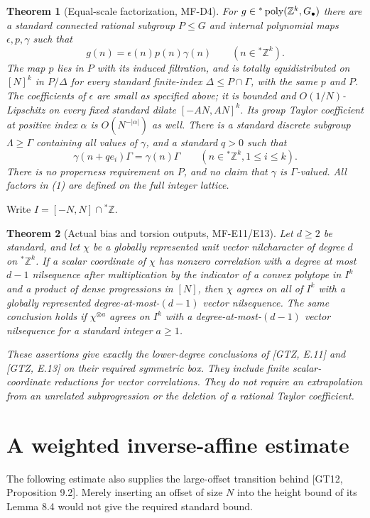 \documentclass[11pt]{article}
\newtheorem{theorem}{Theorem}
\newcommand{\Z}{\mathbb Z}\newcommand{\R}{\mathbb R}
\begin{document}
\begin{theorem}[Equal-scale factorization, MF-D4]\label{thm:factor}
For $g\in{}^*\poly(\Z^k,G_\bullet)$ there are a standard connected rational
subgroup $P\leq G$ and internal polynomial maps $\epsilon,p,\gamma$ such that
\[
                       g(n)=\epsilon(n)p(n)\gamma(n)
                         \qquad(n\in{}^*\Z^k).                 \tag{1}
\]
The map $p$ lies in $P$ with its induced filtration, and is totally
equidistributed on $[N]^k$ in $P/\Delta$ for every standard finite-index
$\Delta\leq P\cap\Gamma$, with the same $p$ and $P$.
The coefficients of $\epsilon$ are small as specified above; it is bounded
and $O(1/N)$-Lipschitz on every fixed standard dilate $[-AN,AN]^k$.
Its group Taylor coefficient at positive index $\alpha$ is
$O(N^{-|\alpha|})$ as well. There is a standard discrete subgroup
$\Lambda\geq\Gamma$ containing all values of $\gamma$, and a standard
$q>0$ such that
\[
           \gamma(n+qe_i)\Gamma=\gamma(n)\Gamma
                  \qquad(n\in{}^*\Z^k, 1\leq i\leq k).       \tag{2}
\]
There is no properness requirement on $P$, and no claim that $\gamma$ is
$\Gamma$-valued. All factors in (1) are defined on the full integer lattice.
\end{theorem}

Write $I=[-N,N]\cap{}^*\Z$.
\begin{theorem}[Actual bias and torsion outputs, MF-E11/E13]\label{thm:outputs}
Let $d\geq2$ be standard, and let $\chi$ be a globally represented unit
vector nilcharacter of degree $d$ on ${}^*\Z^k$.
If a scalar coordinate of $\chi$ has nonzero correlation with a degree
at most $d-1$ nilsequence after multiplication by the indicator of a
convex polytope in $I^k$ and a product of dense progressions in $[N]$,
then $\chi$ agrees on all of $I^k$ with a globally represented
degree-at-most-$(d-1)$ vector nilsequence. The same conclusion holds if
$\chi^{\otimes a}$ agrees on $I^k$ with a degree-at-most-$(d-1)$ vector
nilsequence for a standard integer $a\geq1$.

These assertions give exactly the lower-degree conclusions of [GTZ, E.11]
and [GTZ, E.13] on their required symmetric box. They include finite
scalar-coordinate reductions for vector correlations. They do not require
an extrapolation from an unrelated subprogression or the deletion of a
rational Taylor coefficient.
\end{theorem}

\section{A weighted inverse-affine estimate}
The following estimate also supplies the large-offset transition behind
[GT12, Proposition 9.2]. Merely inserting an offset of size $N$ into the
height bound of its Lemma 8.4 would not give the required standard bound.
\end{document}
